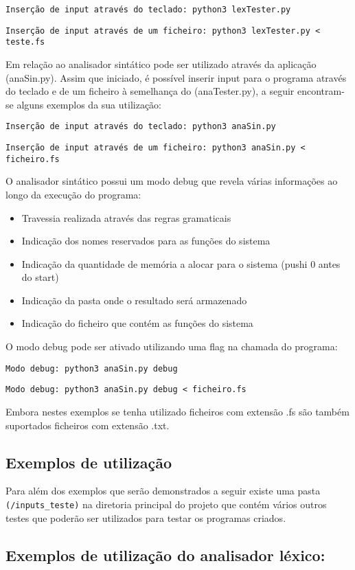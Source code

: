 \documentclass{article}
\begin{document}
\texttt{Inserção de input através do teclado: python3 lexTester.py}

\texttt{Inserção de input através de um ficheiro: python3 lexTester.py < teste.fs }

Em relação ao analisador sintático pode ser utilizado através da aplicação (anaSin.py). Assim que iniciado, é possível inserir input para o programa através do teclado e de um ficheiro à semelhança do (anaTester.py), a seguir encontram-se alguns exemplos da sua utilização:

\texttt{Inserção de input através do teclado: python3 anaSin.py}

\texttt{Inserção de input através de um ficheiro: python3 anaSin.py < ficheiro.fs }

O analisador sintático possui um modo debug que revela várias informações ao longo da execução do programa:

\begin{itemize}
    \item Travessia realizada através das regras gramaticais
    \item Indicação dos nomes reservados para as funções do sistema
    \item Indicação da quantidade de memória a alocar para o sistema (pushi 0 antes do start)
    \item Indicação da pasta onde o resultado será armazenado
    \item Indicação do ficheiro que contém as funções do sistema
\end{itemize}

O modo debug pode ser ativado utilizando uma flag na chamada do programa: \par
\texttt{Modo debug: python3 anaSin.py debug } \par
\texttt{Modo debug: python3 anaSin.py debug < ficheiro.fs }

Embora nestes exemplos se tenha utilizado ficheiros com extensão .fs são também suportados ficheiros com extensão .txt.

\subsection{Exemplos de utilização}
Para além dos exemplos que serão demonstrados a seguir existe uma pasta \verb|(/inputs_teste)| na diretoria principal do projeto que contém vários outros testes que poderão ser utilizados para testar os programas criados.

\subsection{Exemplos de utilização do analisador léxico:}
\end{document}
